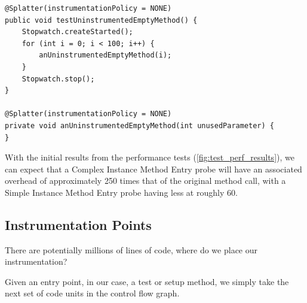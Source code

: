 {\begin{lstlisting}[caption=Uninstrumented Test,label=lst:uninstrumented_test]
@Splatter(instrumentationPolicy = NONE)
public void testUninstrumentedEmptyMethod() {
	Stopwatch.createStarted();
	for (int i = 0; i < 100; i++) {
		anUninstrumentedEmptyMethod(i);
	}
	Stopwatch.stop();
}

@Splatter(instrumentationPolicy = NONE)
private void anUninstrumentedEmptyMethod(int unusedParameter) {
}
\end{lstlisting}

\begin{figure}[h]

\centering
{}

\caption{}
\label{fig:test_perf_results}
\end{figure}

With the initial results from the performance tests
(\autoref{fig:test_perf_results}), we can expect that a Complex Instance Method
Entry probe will have an associated overhead of approximately 250 times that of
the original method call, with a Simple Instance Method Entry probe having less
at roughly 60.

\subsection{Instrumentation Points}
\label{sec:sec:instrumentation_points}

There are potentially millions of lines of code, where do we place our
instrumentation?

Given an entry point, in our case, a test or setup method, we simply take the
next set of code units in the control flow graph.

}
